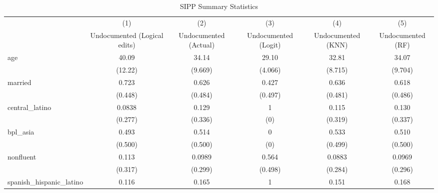 \begin{table}[htbp]\centering
\def\sym#1{\ifmmode^{#1}\else\(^{#1}\)\fi}
\caption{SIPP Summary Statistics \label{tab:sum}}
\begin{tabular}{l*{5}{c}}
\hline\hline
                    &\multicolumn{1}{c}{(1)}         &\multicolumn{1}{c}{(2)}         &\multicolumn{1}{c}{(3)}         &\multicolumn{1}{c}{(4)}         &\multicolumn{1}{c}{(5)}         \\
                    &Undocumented (Logical edits)         &Undocumented (Actual)         &Undocumented (Logit)         &Undocumented (KNN)         &Undocumented (RF)         \\
\hline
age                 &       40.09         &       34.14         &       29.10         &       32.81         &       34.07         \\
                    &     (12.22)         &     (9.669)         &     (4.066)         &     (8.715)         &     (9.704)         \\
[1em]
married             &       0.723         &       0.626         &       0.427         &       0.636         &       0.618         \\
                    &     (0.448)         &     (0.484)         &     (0.497)         &     (0.481)         &     (0.486)         \\
[1em]
central\_latino      &      0.0838         &       0.129         &           1         &       0.115         &       0.130         \\
                    &     (0.277)         &     (0.336)         &         (0)         &     (0.319)         &     (0.337)         \\
[1em]
bpl\_asia            &       0.493         &       0.514         &           0         &       0.533         &       0.510         \\
                    &     (0.500)         &     (0.500)         &         (0)         &     (0.499)         &     (0.500)         \\
[1em]
nonfluent           &       0.113         &      0.0989         &       0.564         &      0.0883         &      0.0969         \\
                    &     (0.317)         &     (0.299)         &     (0.498)         &     (0.284)         &     (0.296)         \\
[1em]
spanish\_hispanic\_latino&       0.116         &       0.165         &           1         &       0.151         &       0.168         \\

\end{tabular}
\end{table}
